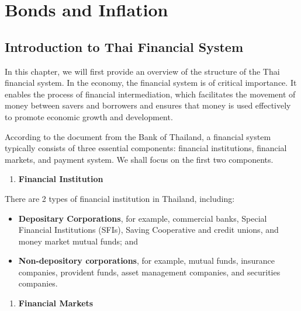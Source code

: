 \documentclass[landscape, 20pt]{extreport}
\providecommand{\tightlist}{%
  \setlength{\itemsep}{0pt}\setlength{\parskip}{0pt}}
\theoremstyle{definition}
\theoremstyle{definition}
\theoremstyle{definition}
\theoremstyle{definition}
\theoremstyle{remark}
\begin{document}
\hypertarget{bonds-and-inflation}{%
\chapter{Bonds and Inflation}\label{bonds-and-inflation}}



\hypertarget{introduction-to-thai-financial-system}{%
\section{Introduction to Thai Financial
System}\label{introduction-to-thai-financial-system}}

In this chapter, we will first provide an overview of the structure of
the Thai financial system. In the economy, the financial system is of
critical importance. It enables the process of financial intermediation,
which facilitates the movement of money between savers and borrowers and
ensures that money is used effectively to promote economic growth and
development.

According to the document from the Bank of Thailand, a financial system
typically consists of three essential components: financial
institutions, financial markets, and payment system. We shall focus on the first two components.

\begin{enumerate}
\def\labelenumi{\arabic{enumi}.}
\tightlist
\item
  \textbf{Financial Institution}
\end{enumerate}

There are 2 types of financial institution in Thailand, including:

\begin{itemize}
\item \textbf{Depositary Corporations}, for example, commercial banks, Special Financial Institutions (SFIs), Saving Cooperative and credit unions, and money market mutual funds; and
    
\item \textbf{Non-depository corporations}, for example, mutual funds, insurance companies, provident funds, asset management companies, and securities companies.
 
\end{itemize}
\newpage
\begin{enumerate}
\def\labelenumi{\arabic{enumi}.}
\setcounter{enumi}{1}
\tightlist
\item
  \textbf{Financial Markets}
\end{enumerate}
\end{document}
